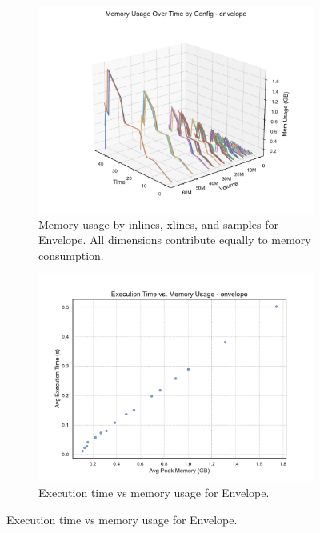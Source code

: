 \begin{figure}[htbp]
    \centering
    \begin{subfigure}[t]{0.49\textwidth}
        \centering
        \includegraphics[width=\textwidth]{assets/images/05/memory_usage_by_configuration_envelope}
        \caption{Memory usage by inlines, xlines, and samples for Envelope.
        All dimensions contribute equally to memory consumption.}
    \end{subfigure}
    \hfill
    \begin{subfigure}[t]{0.49\textwidth}
        \centering
        \includegraphics[width=\textwidth]{assets/images/05/execution_time_vs_memory_envelope}
        \caption{Execution time vs memory usage for Envelope.}

\end{subfigure}
\end{figure}
